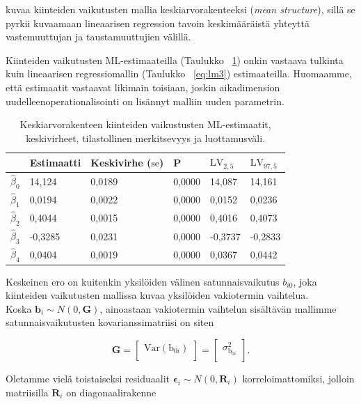 \documentclass[finnish]{docopts}
\begin{document}
\cite{west14} kuvaa kiinteiden vaikutusten mallia keskiarvorakenteeksi (\textit{mean structure}), sillä se pyrkii kuvaamaan lineaarisen regression tavoin keskimääräistä yhteyttä vastemuuttujan ja taustamuuttujien välillä.

Kiinteiden vaikutusten ML-estimaateilla (Taulukko ~\ref{table:lme0}) onkin vastaava tulkinta kuin lineaarisen regressiomallin (Taulukko ~\ref{eq:lm3}) estimaateilla. Huomaamme, että estimaatit vastaavat likimain toisiaan, joskin aikadimension uudelleenoperationalisointi on lisännyt malliin uuden parametrin.\\

\begin{table}[H]
\centering
\begin{tabular}{llllll}
\toprule
  & Estimaatti & Keskivirhe ($\text{se}$) & P & $\text{LV}_{2,5}$ & $\text{LV}_{97,5}$\\
\midrule
$\hat{\beta}_0$ & 14,124 & 0,0189 & 0,0000 & 14,087 & 14,161\\
$\hat{\beta}_1$ & 0,0194 & 0,0022 & 0,0000 & 0,0152 & 0,0236\\
$\hat{\beta}_2$ & 0,4044 & 0,0015 & 0,0000 & 0,4016 & 0,4073\\
$\hat{\beta}_3$ & -0,3285 & 0,0231 & 0,0000 & -0,3737 & -0,2833\\
$\hat{\beta}_4$ & 0,0404 & 0,0019 & 0,0000 & 0,0367 & 0,0442\\
\bottomrule
\end{tabular}
\caption{Keskiarvorakenteen kiinteiden vaikustusten ML-estimaatit, keskivirheet, tilastollinen merkitsevyys ja luottamusväli.}
\label{table:lme0}
\end{table}

Keskeinen ero on kuitenkin yksilöiden välinen satunnaisvaikutus $b_{i0}$, joka kiinteiden vaikutusten mallissa kuvaa yksilöiden vakiotermin vaihtelua. \\

Koska $\bm{b}_i \sim N(0,\bm{G})$, ainoastaan vakiotermin vaihtelun sisältävän mallimme satunnaisvaikutusten kovarianssimatriisi on siten

$$
\bm{G} = 
\begin{bmatrix}
\text{Var}({\text{b}_{0i}})\\
\end{bmatrix} =
\begin{bmatrix}
\sigma^2_{\text{b}_{0i}}\\
\end{bmatrix}.
$$

Oletamme vielä toistaiseksi residuaalit $\bm{\epsilon}_i \sim N(0, \bm{R}_i)$ korreloimattomiksi, jolloin matriisilla $\bm{R}_i$ on diagonaalirakenne
\end{document}
